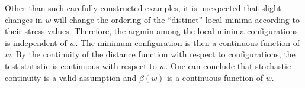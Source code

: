 \documentclass[12pt,oneside,final]{thesis}\usepackage[]{graphicx}\usepackage[]{color}
\begin{document}

Other than such carefully constructed examples, it is  unexpected that slight changes in $w$  will change the ordering of the ``distinct''  local minima according to their stress values.
Therefore,  the argmin among the local minima configurations is independent of $w$. The minimum configuration is then a continuous function of $w$. 
By the continuity of the distance function with respect to configurations, the test statistic is continuous with respect to $w$. One can conclude  that stochastic continuity  is a valid assumption and $\beta(w) $ is a continuous function of $w$. 

\end{document}
